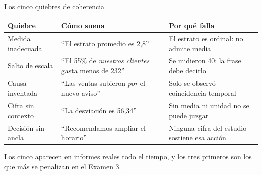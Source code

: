 \documentclass[aspectratio=169,10pt]{beamer}
\begin{document}
\begin{frame}{Los cinco quiebres de coherencia}
  \scriptsize
  \begin{center}
  \begin{tabular}{@{}p{2.5cm}p{4.6cm}p{4.8cm}@{}}
    \toprule
    \textbf{Quiebre} & \textbf{Cómo suena} & \textbf{Por qué falla} \\
    \midrule
    Medida inadecuada &
      ``El estrato promedio es 2,8'' &
      El estrato es ordinal: no admite media \\
    \addlinespace
    Salto de escala &
      ``El 55\% de \emph{nuestros clientes} gasta menos de 232'' &
      Se midieron 40: la frase debe decirlo \\
    \addlinespace
    Causa inventada &
      ``Las ventas subieron \emph{por} el nuevo aviso'' &
      Solo se observó coincidencia temporal \\
    \addlinespace
    Cifra sin contexto &
      ``La desviación es 56,34'' &
      Sin media ni unidad no se puede juzgar \\
    \addlinespace
    Decisión sin ancla &
      ``Recomendamos ampliar el horario'' &
      Ninguna cifra del estudio sostiene esa acción \\
    \bottomrule
  \end{tabular}
  \end{center}

  \vspace{0.05cm}
  {\tiny\color{uniGris} Los cinco aparecen en informes reales todo el tiempo, y
  los tres primeros son los que más se penalizan en el Examen 3.}
\end{frame}
\end{document}
